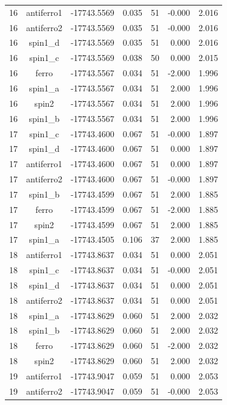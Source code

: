\begin{longtable}{@{}ccrrrrr@{}}
\rowcolor{gray!20} 16 & antiferro1 & -17743.5569 & 0.035 & 51 & -0.000 & 2.016 \\
16 & antiferro2 & -17743.5569 & 0.035 & 51 & -0.000 & 2.016 \\
16 & spin1\_d & -17743.5569 & 0.035 & 51 & 0.000 & 2.016 \\
16 & spin1\_c & -17743.5569 & 0.038 & 50 & 0.000 & 2.015 \\
16 & ferro & -17743.5567 & 0.034 & 51 & -2.000 & 1.996 \\
16 & spin1\_a & -17743.5567 & 0.034 & 51 & 2.000 & 1.996 \\
16 & spin2 & -17743.5567 & 0.034 & 51 & 2.000 & 1.996 \\
16 & spin1\_b & -17743.5567 & 0.034 & 51 & 2.000 & 1.996 \\
\rowcolor{gray!20} 17 & spin1\_c & -17743.4600 & 0.067 & 51 & -0.000 & 1.897 \\
17 & spin1\_d & -17743.4600 & 0.067 & 51 & 0.000 & 1.897 \\
17 & antiferro1 & -17743.4600 & 0.067 & 51 & 0.000 & 1.897 \\
17 & antiferro2 & -17743.4600 & 0.067 & 51 & -0.000 & 1.897 \\
17 & spin1\_b & -17743.4599 & 0.067 & 51 & 2.000 & 1.885 \\
17 & ferro & -17743.4599 & 0.067 & 51 & -2.000 & 1.885 \\
17 & spin2 & -17743.4599 & 0.067 & 51 & 2.000 & 1.885 \\
17 & spin1\_a & -17743.4505 & 0.106 & 37 & 2.000 & 1.885 \\
\rowcolor{gray!20} 18 & antiferro1 & -17743.8637 & 0.034 & 51 & 0.000 & 2.051 \\
18 & spin1\_c & -17743.8637 & 0.034 & 51 & -0.000 & 2.051 \\
18 & spin1\_d & -17743.8637 & 0.034 & 51 & 0.000 & 2.051 \\
18 & antiferro2 & -17743.8637 & 0.034 & 51 & 0.000 & 2.051 \\
18 & spin1\_a & -17743.8629 & 0.060 & 51 & 2.000 & 2.032 \\
18 & spin1\_b & -17743.8629 & 0.060 & 51 & 2.000 & 2.032 \\
18 & ferro & -17743.8629 & 0.060 & 51 & -2.000 & 2.032 \\
18 & spin2 & -17743.8629 & 0.060 & 51 & 2.000 & 2.032 \\
\rowcolor{gray!20} 19 & antiferro1 & -17743.9047 & 0.059 & 51 & 0.000 & 2.053 \\
19 & antiferro2 & -17743.9047 & 0.059 & 51 & -0.000 & 2.053 \\

\end{longtable}
